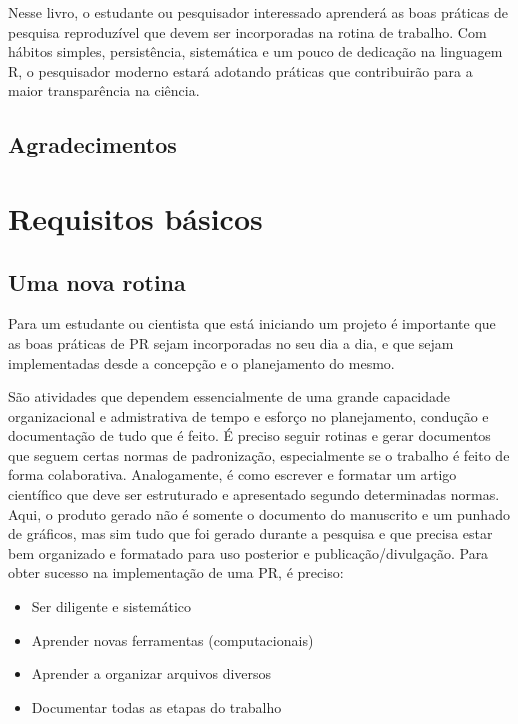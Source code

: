 \documentclass[]{book}
\providecommand{\tightlist}{%
  \setlength{\itemsep}{0pt}\setlength{\parskip}{0pt}}
\begin{document}
Nesse livro, o estudante ou pesquisador interessado aprenderá as boas
práticas de pesquisa reproduzível que devem ser incorporadas na rotina
de trabalho. Com hábitos simples, persistência, sistemática e um pouco
de dedicação na linguagem R, o pesquisador moderno estará adotando
práticas que contribuirão para a maior transparência na ciência.

\hypertarget{agradecimentos}{%
\section*{Agradecimentos}\label{agradecimentos}}

\hypertarget{intro}{%
\chapter{Requisitos básicos}\label{intro}}

\hypertarget{uma-nova-rotina}{%
\section{Uma nova rotina}\label{uma-nova-rotina}}

Para um estudante ou cientista que está iniciando um projeto é
importante que as boas práticas de PR sejam incorporadas no seu dia a
dia, e que sejam implementadas desde a concepção e o planejamento do
mesmo.

São atividades que dependem essencialmente de uma grande capacidade
organizacional e admistrativa de tempo e esforço no planejamento,
condução e documentação de tudo que é feito. É preciso seguir rotinas e
gerar documentos que seguem certas normas de padronização, especialmente
se o trabalho é feito de forma colaborativa. Analogamente, é como
escrever e formatar um artigo científico que deve ser estruturado e
apresentado segundo determinadas normas. Aqui, o produto gerado não é
somente o documento do manuscrito e um punhado de gráficos, mas sim tudo
que foi gerado durante a pesquisa e que precisa estar bem organizado e
formatado para uso posterior e publicação/divulgação. Para obter sucesso
na implementação de uma PR, é preciso:

\begin{itemize}
\tightlist
\item
  Ser diligente e sistemático
\item
  Aprender novas ferramentas (computacionais)
\item
  Aprender a organizar arquivos diversos
\item
  Documentar todas as etapas do trabalho
\end{itemize}
\end{document}
